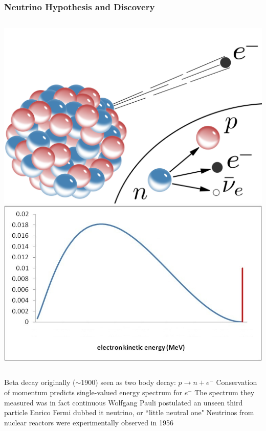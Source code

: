\documentclass[10pt,professionalfonts,xcolor=table]{beamer}
\begin{document}
\frame
{
  \frametitle{Neutrino Hypothesis  and Discovery}

  \begin{columns}[c]
  \centering
  \includegraphics[height=0.37\textheight]{figures/figures/betaPretty.png}
  \centering
  \includegraphics[height=0.37\textheight]{figures/figures/betaspec.jpg}
  \end{columns}
  \gap
  \begin{itemize}
  \bang Beta decay originally ($\sim$1900) seen as two body decay: $p \rightarrow n + e^-$
  \bang Conservation of momentum predicts single-valued energy spectrum for $e^-$
  \bang The spectrum they measured was in fact continuous
  \vspace{10pt}
  \bang Wolfgang Pauli postulated an unseen third particle
  \bang Enrico Fermi dubbed it neutrino, or ``little neutral one"
  \bang Neutrinos from nuclear reactors were experimentally observed in 1956
  \end{itemize}
}
\end{document}
